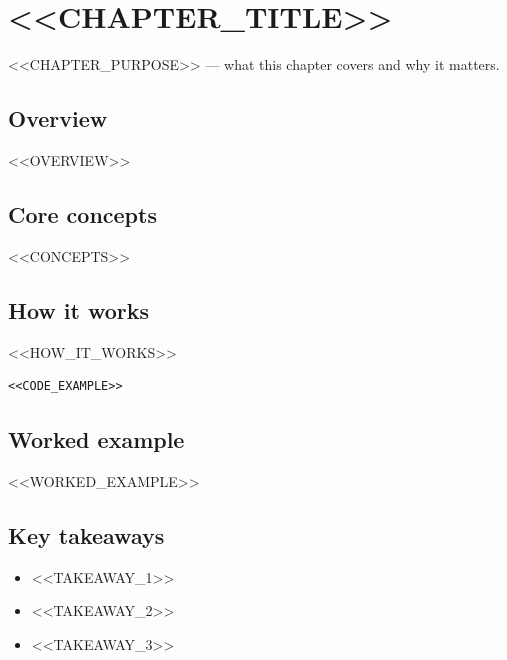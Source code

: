 \chapter{<<CHAPTER_TITLE>>}

\begin{notebox}
  <<CHAPTER_PURPOSE>> — what this chapter covers and why it matters.
\end{notebox}

\section{Overview}

<<OVERVIEW>>

\section{Core concepts}

<<CONCEPTS>>

%   

\section{How it works}

<<HOW_IT_WORKS>>

\begin{lstlisting}[language=<<LANG>>, caption=<<CODE_CAPTION>>, label=lst:<<LABEL>>]
<<CODE_EXAMPLE>>
\end{lstlisting}

\section{Worked example}

<<WORKED_EXAMPLE>>

\section{Key takeaways}

\begin{itemize}
  \item <<TAKEAWAY_1>>
  \item <<TAKEAWAY_2>>
  \item <<TAKEAWAY_3>>
\end{itemize}
